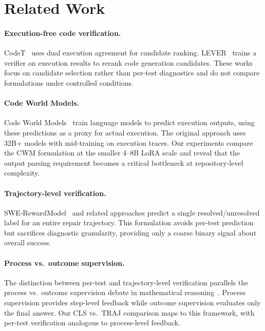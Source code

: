 \documentclass[11pt,a4paper]{article}
\begin{document}
\section{Related Work}

\paragraph{Execution-free code verification.}
CodeT~\cite{chen2023codet} uses dual execution agreement for candidate ranking. LEVER~\cite{ni2023lever} trains a verifier on execution results to rerank code generation candidates. These works focus on candidate selection rather than per-test diagnostics and do not compare formulations under controlled conditions.

\paragraph{Code World Models.}
Code World Models~\cite{ding2024cwm} train language models to predict execution outputs, using these predictions as a proxy for actual execution. The original approach uses 32B+ models with mid-training on execution traces. Our experiments compare the CWM formulation at the smaller 4--8B LoRA scale and reveal that the output parsing requirement becomes a critical bottleneck at repository-level complexity.

\paragraph{Trajectory-level verification.}
SWE-RewardModel~\cite{zhang2025swerm} and related approaches predict a single resolved/unresolved label for an entire repair trajectory. This formulation avoids per-test prediction but sacrifices diagnostic granularity, providing only a coarse binary signal about overall success.

\paragraph{Process vs.\ outcome supervision.}
The distinction between per-test and trajectory-level verification parallels the process vs.\ outcome supervision debate in mathematical reasoning~\cite{lightman2023lets, uesato2022solving}. Process supervision provides step-level feedback while outcome supervision evaluates only the final answer. Our CLS vs.\ TRAJ comparison maps to this framework, with per-test verification analogous to process-level feedback.
\end{document}
